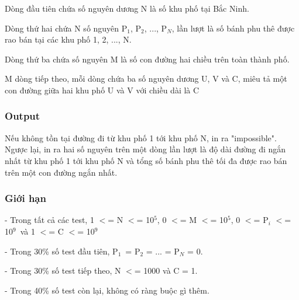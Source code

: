 Dòng đầu tiên chứa số nguyên dương N là số khu phố tại Bắc Ninh.

Dòng thứ hai chứa N số nguyên P$_1$, P$_2$, ..., P$_N$, lần lượt là số bánh phu thê được rao bán tại các khu phố 1, 2, ..., N.

Dòng thứ ba chứa số nguyên M là số con đường hai chiều trên toàn thành phố.

M dòng tiếp theo, mỗi dòng chứa ba số nguyên dương U, V và C, miêu tả một con đường giữa hai khu phố U và V với chiều dài là C

\subsubsection{Output}

Nếu không tồn tại đường đi từ khu phố 1 tới khu phố N, in ra "impossible". Ngược lại, in ra hai số nguyên trên một dòng lần lượt là độ dài đường đi ngắn nhất từ khu phố 1 tới khu phố N và tổng số bánh phu thê tối đa được rao bán trên một con đường ngắn nhất.

\subsubsection{Giới hạn}

- Trong tất cả các test, 1 $<$= N $<$= 10$^5$, 0 $<$= M $<$= 10$^5$, 0 $<$= P$_i$ $<$= 10$^9$ và 1 $<$= C $<$= 10$^9$

- Trong 30\% số test đầu tiên, P$_1$ = P$_2$ = ... = P$_N$ = 0.

- Trong 30\% số test tiếp theo, N $<$= 1000 và C = 1.

- Trong 40\% số test còn lại, không có ràng buộc gì thêm.

